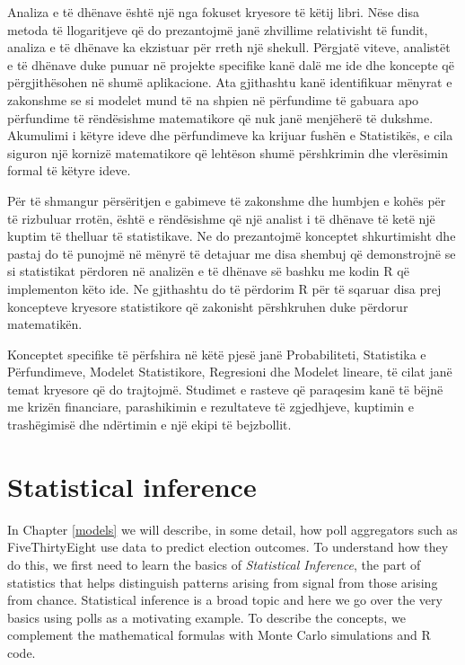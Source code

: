 \documentclass[openany]{book}
\begin{document}
Analiza e të dhënave është një nga fokuset kryesore të këtij libri. Nëse disa metoda të llogaritjeve që do prezantojmë janë zhvillime relativisht të fundit, analiza e të dhënave ka ekzistuar për rreth një shekull. Përgjatë viteve, analistët e të dhënave duke punuar në projekte specifike kanë dalë me ide dhe koncepte që përgjithësohen në shumë aplikacione. Ata gjithashtu kanë identifikuar mënyrat e zakonshme se si modelet mund të na shpien në përfundime të gabuara apo përfundime të rëndësishme matematikore që nuk janë menjëherë të dukshme. Akumulimi i këtyre ideve dhe përfundimeve ka krijuar fushën e Statistikës, e cila siguron një kornizë matematikore që lehtëson shumë përshkrimin dhe vlerësimin formal të këtyre ideve.

Për të shmangur përsëritjen e gabimeve të zakonshme dhe humbjen e kohës për të rizbuluar rrotën, është e rëndësishme që një analist i të dhënave të ketë një kuptim të thelluar të statistikave. Ne do prezantojmë konceptet shkurtimisht dhe pastaj do të punojmë në mënyrë të detajuar me disa shembuj që demonstrojnë se si statistikat përdoren në analizën e të dhënave së bashku me kodin R që implementon këto ide. Ne gjithashtu do të përdorim R për të sqaruar disa prej koncepteve kryesore statistikore që zakonisht përshkruhen duke përdorur matematikën.

Konceptet specifike të përfshira në këtë pjesë janë Probabiliteti, Statistika e Përfundimeve, Modelet Statistikore, Regresioni dhe Modelet lineare, të cilat janë temat kryesore që do trajtojmë. Studimet e rasteve që paraqesim kanë të bëjnë me krizën financiare, parashikimin e rezultateve të zgjedhjeve, kuptimin e trashëgimisë dhe ndërtimin e një ekipi të bejzbollit.

\hypertarget{inference}{%
\chapter{Statistical inference}\label{inference}}

In Chapter \ref{models} we will describe, in some detail, how poll aggregators such as FiveThirtyEight use data to predict election outcomes. To understand how they do this, we first need to learn the basics of \emph{Statistical Inference}, the part of statistics that helps distinguish patterns arising from signal from those arising from chance. Statistical inference is a broad topic and here we go over the very basics using polls as a motivating example. To describe the concepts, we complement the mathematical formulas with Monte Carlo simulations and R code.
\end{document}
